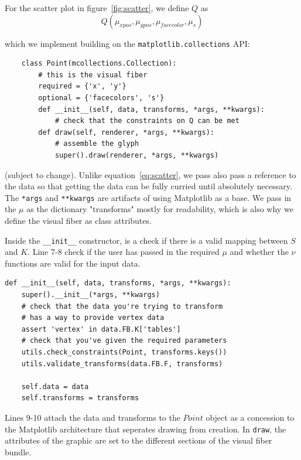 \documentclass[../main.tex]{subfiles}
\begin{document}
For the scatter plot in figure~\ref{fig:scatter}, we define $Q$ as 
 \begin{equation}
    Q(\mu_{xpos}, \mu_{ypos}, \mu_{facecolor}, \mu_{s})
    \label{eq:scatter}
 \end{equation}

which we implement building on the \texttt{matplotlib.collections} API:

\begin{verbatim}
    class Point(mcollections.Collection):
        # this is the visual fiber 
        required = {'x', 'y'}
        optional = {'facecolors', 's'} 
        def __init__(self, data, transforms, *args, **kwargs):
            # check that the constraints on Q can be met  
        def draw(self, renderer, *args, **kwargs):
            # assemble the glyph
            super().draw(renderer, *args, **kwargs)
    \end{verbatim}
    
(subject to change). Unlike equation~\ref{eq:scatter}, we pass also pass a reference to the data so that getting the data can be fully curried until absolutely necessary. The \texttt{*args} and \texttt{**kwargs} are artifacts of using Matplotlib as a base. We pass in the $\mu$ as the dictionary "transforms" mostly for readability, which is also why we define the visual fiber as class attributes.

Inside the \texttt{__init__} constructor, is a check if there is a valid mapping between $S$ and $K$.  Line 7-8 check if the user has passed in the required $\mu$ and whether the $\nu$ functions are valid for the input data.

\begin{verbatim}
def __init__(self, data, transforms, *args, **kwargs):
    super().__init__(*args, **kwargs)
    # check that the data you're trying to transform 
    # has a way to provide vertex data  
    assert 'vertex' in data.FB.K['tables']
    # check that you've given the required parameters
    utils.check_constraints(Point, transforms.keys())
    utils.validate_transforms(data.FB.F, transforms)

    self.data = data
    self.transforms = transforms
\end{verbatim}

Lines 9-10 attach the data and transforms to the $Point$ object as a concession to the Matplotlib architecture that seperates drawing from creation. In \texttt{draw}, the attributes of the graphic are set to the different sections of the visual fiber bundle. 
\end{document}
